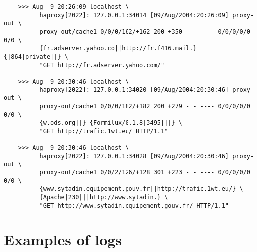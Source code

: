 \begin{verbatim}
    >>> Aug  9 20:26:09 localhost \
          haproxy[2022]: 127.0.0.1:34014 [09/Aug/2004:20:26:09] proxy-out \
          proxy-out/cache1 0/0/0/162/+162 200 +350 - - ---- 0/0/0/0/0 0/0 \
          {fr.adserver.yahoo.co||http://fr.f416.mail.} {|864|private||} \
          "GET http://fr.adserver.yahoo.com/"

    >>> Aug  9 20:30:46 localhost \
          haproxy[2022]: 127.0.0.1:34020 [09/Aug/2004:20:30:46] proxy-out \
          proxy-out/cache1 0/0/0/182/+182 200 +279 - - ---- 0/0/0/0/0 0/0 \
          {w.ods.org||} {Formilux/0.1.8|3495|||} \
          "GET http://trafic.1wt.eu/ HTTP/1.1"

    >>> Aug  9 20:30:46 localhost \
          haproxy[2022]: 127.0.0.1:34028 [09/Aug/2004:20:30:46] proxy-out \
          proxy-out/cache1 0/0/2/126/+128 301 +223 - - ---- 0/0/0/0/0 0/0 \
          {www.sytadin.equipement.gouv.fr||http://trafic.1wt.eu/} \
          {Apache|230|||http://www.sytadin.} \
          "GET http://www.sytadin.equipement.gouv.fr/ HTTP/1.1"
\end{verbatim}

\section{Examples of logs}

